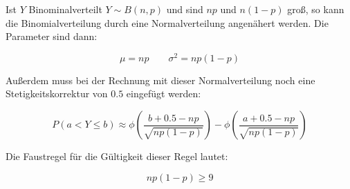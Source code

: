 Ist $Y$ Binominalverteilt $Y \sim B(n,p)$ und sind $np$ und $n(1-p)$ groß, so kann die Binomialverteilung durch eine Normalverteilung angenähert werden.
Die Parameter sind dann:

\[\mu = np \qquad \sigma^2=np(1-p)\]

Außerdem muss bei der Rechnung mit dieser Normalverteilung noch eine Stetigkeitskorrektur von $0.5$ eingefügt werden:

\[P(a < Y \le b) \approx 
  \phi\left(\frac{b+\mathbf{0.5}-np}{\sqrt{np(1-p)}}\right) - 
  \phi\left(\frac{a+\mathbf{0.5}-np}{\sqrt{np(1-p)}}\right)\]

Die Faustregel für die Gültigkeit dieser Regel lautet:

\[np(1-p) \ge 9\]

